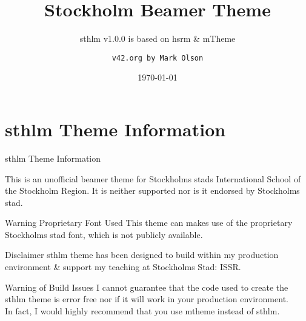 \documentclass[newPxFont]{beamer}
\title{Stockholm Beamer Theme}
\subtitle{sthlm v1.0.0 is based on hsrm \& mTheme}
\date{\today}
\author{\texttt{v42.org by Mark Olson}}
\institute{Made in \textit{Sweden}}
\begin{document}
%
%

\maketitle


%
%

\section*{sthlm Theme Information}


\begin{frame}[c]{sthlm Theme Information}

This is an \alert{unofficial} beamer theme for Stockholms stads International School of the Stockholm Region. It is neither supported nor is it endorsed by Stockholms stad.

\vspace{1em}

\begin{alertblock}{Warning Proprietary Font Used}
This theme can makes use of the proprietary Stockholms stad font, which is not publicly available.
\end{alertblock}

\end{frame}


\begin{frame}[c]{Disclaimer}
sthlm theme has been designed to build within my production environment \& support my teaching at Stockholms Stad: ISSR. \\

\vspace{1em}

\begin{alertblock}{Warning of Build Issues}
I cannot guarantee that the code used to create the sthlm theme is error free nor if it will work in your production environment. \\
\vspace{1em}
In fact, I would highly recommend that you use mtheme instead of sthlm.
\end{alertblock}

\end{frame}
\end{document}
